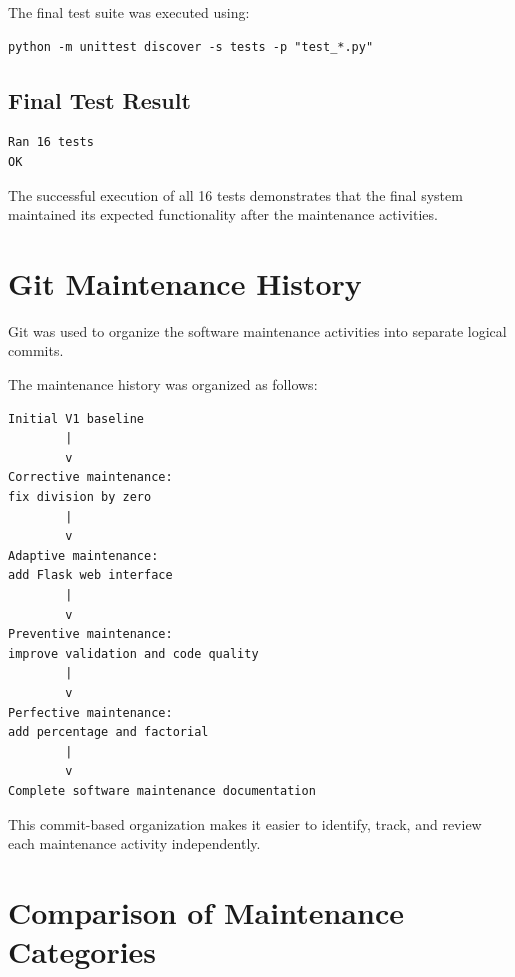 \documentclass[12pt,a4paper,openany]{report}
\begin{document}
The final test suite was executed using:

\begin{lstlisting}[language={}]
python -m unittest discover -s tests -p "test_*.py"
\end{lstlisting}

\section{Final Test Result}

\begin{verbatim}
Ran 16 tests
OK
\end{verbatim}

The successful execution of all 16 tests demonstrates that the final
system maintained its expected functionality after the maintenance
activities.


\chapter{Git Maintenance History}

Git was used to organize the software maintenance activities into
separate logical commits.

The maintenance history was organized as follows:

\begin{verbatim}
Initial V1 baseline
        |
        v
Corrective maintenance:
fix division by zero
        |
        v
Adaptive maintenance:
add Flask web interface
        |
        v
Preventive maintenance:
improve validation and code quality
        |
        v
Perfective maintenance:
add percentage and factorial
        |
        v
Complete software maintenance documentation
\end{verbatim}

This commit-based organization makes it easier to identify, track, and
review each maintenance activity independently.


\chapter{Comparison of Maintenance Categories}
\end{document}
